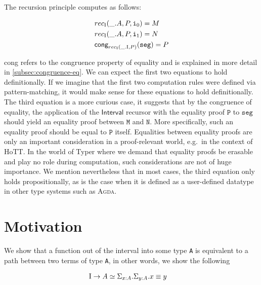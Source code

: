 \documentclass[12pt,twoside,maitrise]{dms}
\theoremstyle{definition}
\numberwithin{equation}{section}
\numberwithin{table}{chapter}
\numberwithin{figure}{chapter}
\newcommand\kw[1] {\textsf{#1}}
\newcommand\id[1] {\texttt{#1}}
\def\Agda{\textsc{Agda}\xspace}
\begin{document}
The recursion principle computes as follows:

\begin{align*}
  & rec_{\bI}(\_ . A, P, \ileft) = M \\
  & rec_{\bI}(\_ . A, P, \iright) = N \\
  & \kw{cong}_{rec_{\bI}(\_ . \bI, P)}(\id{seg}) = P
\end{align*}

\kw{cong} refers to the congruence property of equality and is explained in more
detail in \autoref{subsec:congruence-eq}. We can expect the first two equations
to hold definitionally. If we imagine that the first two computation rules were
defined via pattern-matching, it would make sense for these equations to hold
definitionally. The third equation is a more curious case, it suggests that by
the congruence of equality, the application of the $\kw{Interval}$ recursor with the
equality proof $\id{P}$ to $\id{seg}$ should yield an equality proof between
$\id{M}$ and $\id{N}$. More specifically, such an equality proof should be equal
to $\id{P}$ itself. Equalities between equality proofs are only an important
consideration in a proof-relevant world, e.g.\ in the context of HoTT. In the
world of Typer where we demand that equality proofs be erasable and play no role
during computation, such considerations are not of huge importance. We mention
nevertheless that in most cases, the third equation only holds propositionally,
as is the case when it is defined as a user-defined datatype in other type
systems such as \Agda{}.

\section{Motivation}
We show that a function out of the interval into some type \id{A} is equivalent to a path between two terms of type \id{A}, in other words, we show the following

\begin{align*}
  & \bI \rightarrow A \simeq \Sigma_{\oftype{x}{A}} . \Sigma_{\oftype{y}{A}} . \eqtype{x}{y}
\end{align*}
\end{document}
